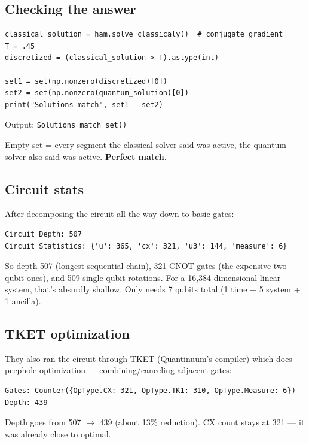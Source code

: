 \documentclass[11pt, a4paper]{article}
\begin{document}
\subsection{Checking the answer}

\begin{lstlisting}
classical_solution = ham.solve_classicaly()  # conjugate gradient
T = .45
discretized = (classical_solution > T).astype(int)

set1 = set(np.nonzero(discretized)[0])
set2 = set(np.nonzero(quantum_solution)[0])
print("Solutions match", set1 - set2)
\end{lstlisting}

Output: \texttt{Solutions match set()}

\begin{tcolorbox}[nb]
Empty set = every segment the classical solver said was active, the
quantum solver also said was active. \textbf{Perfect match.}
\end{tcolorbox}

\subsection{Circuit stats}

After decomposing the circuit all the way down to basic gates:

\begin{verbatim}
Circuit Depth: 507
Circuit Statistics: {'u': 365, 'cx': 321, 'u3': 144, 'measure': 6}
\end{verbatim}

So depth 507 (longest sequential chain), 321 CNOT gates (the expensive
two-qubit ones), and 509 single-qubit rotations. For a 16,384-dimensional
linear system, that's absurdly shallow. Only needs 7 qubits total
(1 time + 5 system + 1 ancilla).

\subsection{TKET optimization}

They also ran the circuit through TKET (Quantinuum's compiler) which
does peephole optimization --- combining/canceling adjacent gates:

\begin{verbatim}
Gates: Counter({OpType.CX: 321, OpType.TK1: 310, OpType.Measure: 6})
Depth: 439
\end{verbatim}

Depth goes from 507 $\to$ 439 (about 13\% reduction). CX count stays at
321 --- it was already close to optimal.
\end{document}
